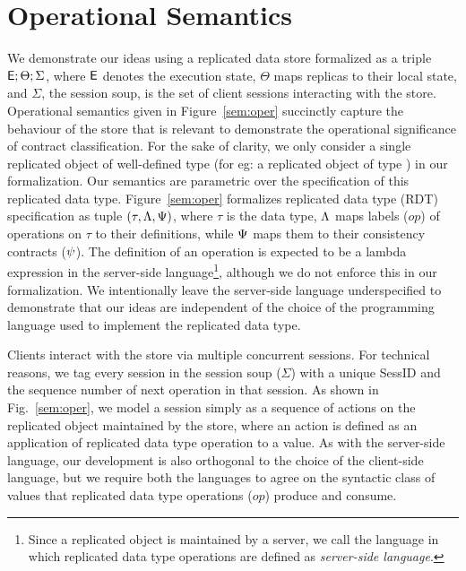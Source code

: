 \section{Operational Semantics}
\label{sec:core-opsem}

We demonstrate our ideas using a replicated data store formalized as a
triple ${\normalfont \textsf{E}};\Theta;\Sigma$, where ${\normalfont \textsf{E}}$ denotes the execution state,
$\Theta$ maps replicas to their local state, and $\Sigma$, the session
soup, is the set of client sessions interacting with the store.
Operational semantics given in Figure~\ref{sem:oper} succinctly
capture the behaviour of the store that is relevant to demonstrate the
operational significance of contract classification. For the sake of
clarity, we only consider a single replicated object of well-defined
type (for eg: a replicated object of type ) in our
formalization.  Our semantics are parametric over the specification of
this replicated data type.  Figure~\ref{sem:oper} formalizes
replicated data type (RDT) specification as tuple
$(\tau,\Lambda,\Psi)$, where $\tau$ is the data type, $\Lambda$ maps
labels ($op$) of operations on $\tau$ to their definitions, while
$\Psi$ maps them to their consistency contracts ($\psi$). The
definition of an operation is expected to be a lambda expression in
the server-side language\footnote{Since a replicated object is
maintained by a server, we call the language in which replicated data
type operations are defined as \emph{server-side language}.}, although
we do not enforce this in our formalization. We intentionally leave
the server-side language underspecified to demonstrate that our ideas
are independent of the choice of the programming language used to
implement the replicated data type. 



Clients interact with the store via multiple concurrent sessions. For
technical reasons, we tag every session in the session soup ($\Sigma$)
with a unique {\sf SessID} and the sequence number of next operation
in that session. As shown in Fig.~\ref{sem:oper}, we model a session
simply as a sequence of actions on the replicated object maintained by
the store, where an action is defined as an application of replicated
data type operation to a value. As with the server-side language, our
development is also orthogonal to the choice of the client-side
language, but we require both the languages to agree on the syntactic
class of values that replicated data type operations ($op$) produce
and consume. 

